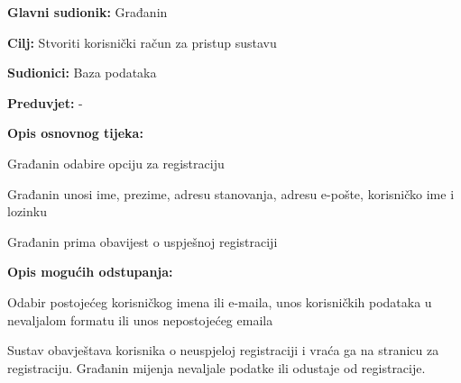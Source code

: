 					\noindent {}
					\begin{packed_item}
	
						\item \textbf{Glavni sudionik: }Građanin
						\item  \textbf{Cilj:} Stvoriti korisnički račun za pristup sustavu
						\item  \textbf{Sudionici:} Baza podataka
						\item  \textbf{Preduvjet:} -
						\item  \textbf{Opis osnovnog tijeka:}
						
						\item[] \begin{packed_enum}
	
							\item Građanin odabire opciju za registraciju
							\item Građanin unosi ime, prezime, adresu stanovanja, adresu e-pošte, korisničko ime i lozinku
							\item Građanin prima obavijest o uspješnoj registraciji
						\end{packed_enum}
						
						\item  \textbf{Opis mogućih odstupanja:}
						
						\item[] \begin{packed_item}
	
							\item[2.a] Odabir postojećeg korisničkog imena ili e-maila, unos korisničkih podataka u nevaljalom formatu ili unos nepostojećeg emaila
							\item[] \begin{packed_enum}
								
								\item Sustav obavještava korisnika o neuspjeloj registraciji i vraća ga na stranicu za registraciju. Građanin mijenja nevaljale podatke ili odustaje od registracije.
								
								
							\end{packed_enum}

							
						\end{packed_item}
					\end{packed_item}
				
